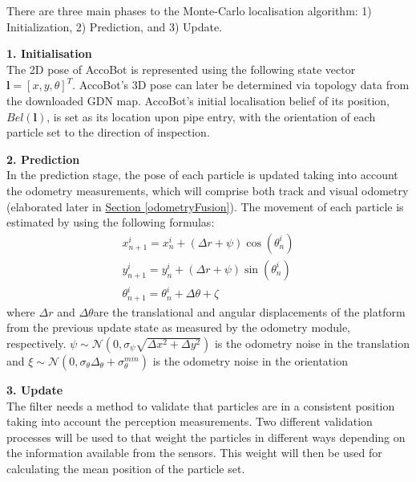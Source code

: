 \documentclass[11pt]{article}		%
\newcommand{\sectref}[1]{\hyperref[#1]{Section \ref*{#1}}}     %
\begin{document}
        \hspace*{2ex}There are three main phases to the Monte-Carlo localisation algorithm: 1) Initialization, 2) Prediction, and 3) Update.
	    
	    \textbf{1. Initialisation}
	    \\The 2D pose of AccoBot is represented using the following state vector $\boldsymbol{l}=[x,  y,\theta]^{T}$. AccoBot's 3D pose can later be determined via topology data from the downloaded GDN map. AccoBot's initial localisation belief of its position, $Bel(\boldsymbol{l})$, is set as its location upon pipe entry, with the orientation of each particle set to the direction of inspection. 
	    
	    \textbf{2. Prediction}
	    \\In the prediction stage, the pose of each particle is updated taking into account the odometry measurements, which will comprise both track and visual odometry (elaborated later in \sectref{odometryFusion}). The movement of each particle is estimated by using the following formulas:
	    \begin{equation}
\begin{array}{l}
x_{n+1}^{i}=x_{n}^{i}+(\Delta r+\psi) \cos \left(\theta_{n}^{i}\right) \\
y_{n+1}^{i}=y_{n}^{i}+(\Delta r+\psi) \sin \left(\theta_{n}^{i}\right) \\
\theta_{n+1}^{i}=\theta_{n}^{i}+\Delta \theta+\zeta
\end{array}
\end{equation}\label{47}
    where $\Delta r$ and $\Delta \theta$are the translational and angular displacements of the platform from the previous
    update state as measured by the odometry module, respectively. $\psi \sim \mathcal{N}\left(0, \sigma_{\psi} \sqrt{\Delta x^{2}+\Delta y^{2}}\right)$ is the odometry noise in the translation and $\xi \sim \mathcal{N}\left(0, \sigma_{\theta} \Delta_{\theta}+\sigma_{\theta}^{m i n}\right)$ is the odometry noise in the orientation
	
	\textbf{3. Update}
	\\The filter needs a method to validate that particles are in a consistent position taking into account the perception measurements. Two different validation processes will be used to that weight the particles in different ways depending on the information available from the sensors.
    This weight will then be used for calculating the mean position of the particle set.
    
\end{document}
